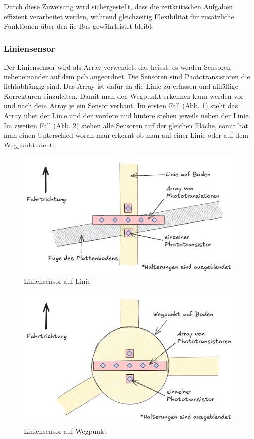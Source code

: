 Durch diese Zuweisung wird sichergestellt, dass die zeitkritischen Aufgaben effizient verarbeitet werden, während gleichzeitig Flexibilität für zusätzliche Funktionen über den \acrshort{iic}-Bus gewährleistet bleibt.


\subsubsection*{Liniensensor}


Der Liniensensor wird als Array verwendet, das heisst, es werden Sensoren nebeneinander auf dem \acrshort{pcb} angeordnet. Die Sensoren sind Phototransistoren die lichtabhängig sind. Das Array ist dafür da die Linie zu erfassen und allfällige Korrekturen einzuleiten. Damit man den Wegpunkt erkennen kann werden vor und nach dem Array je ein Sensor verbaut. Im ersten Fall (Abb. \ref{fig: Liniensensor auf Linie}) steht das Array über der Linie und der vordere und hintere stehen jeweils neben der Linie. Im zweiten Fall (Abb. \ref{fig: Liniensensor auf Wegpunkt}) stehen alle Sensoren auf der gleichen Fläche, somit hat man einen Unterschied woran man erkennt ob man auf einer Linie oder auf dem Wegpunkt steht.


\begin{figure}[H]
    \centering
    \includegraphics[width=0.8\linewidth]{img/linesensor_on_line.png}
    \caption{Liniensensor auf Linie}
    \label{fig: Liniensensor auf Linie}
\end{figure}


\begin{figure}[H]
    \centering
    \includegraphics[width=0.8\linewidth]{img/linesensor_on_node.png}
    \caption{Liniensensor auf Wegpunkt}
    \label{fig: Liniensensor auf Wegpunkt}
\end{figure}




